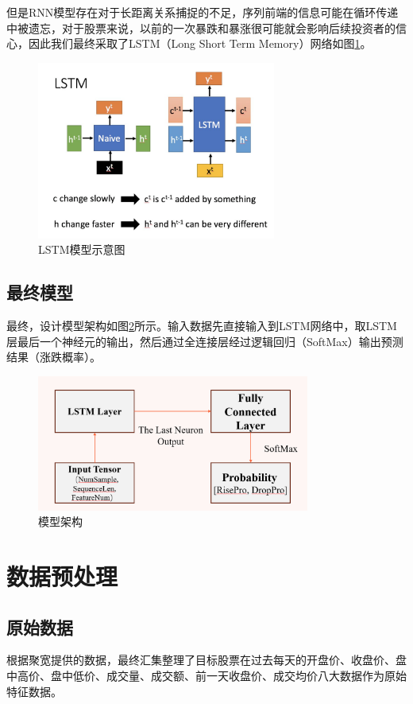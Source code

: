 \documentclass[UTF8]{ctexart}
\begin{document}
但是RNN模型存在对于长距离关系捕捉的不足，序列前端的信息可能在循环传递中被遗忘，对于股票来说，以前的一次暴跌和暴涨很可能就会影响后续投资者的信心，因此我们最终采取了LSTM（Long Short Term Memory）网络如图\ref{fig:LSTM}。
\begin{figure}[h]
    \centering
    \includegraphics[width=0.7\textwidth]{images/LSTM.png}
    \caption{LSTM模型示意图}
    \label{fig:LSTM}
\end{figure}
\subsection{最终模型}
最终，设计模型架构如图\ref{fig:Model}所示。输入数据先直接输入到LSTM网络中，取LSTM层最后一个神经元的输出，然后通过全连接层经过逻辑回归（SoftMax）输出预测结果（涨跌概率）。
\begin{figure}[htbp]
    \centering
    \includegraphics[width=0.8\textwidth]{images/model.png}
    \caption{模型架构}
    \label{fig:Model}
\end{figure}
\section{数据预处理}
\subsection{原始数据}
根据聚宽提供的数据，最终汇集整理了目标股票在过去每天的开盘价、收盘价、盘中高价、盘中低价、成交量、成交额、前一天收盘价、成交均价八大数据作为原始特征数据。
\end{document}
